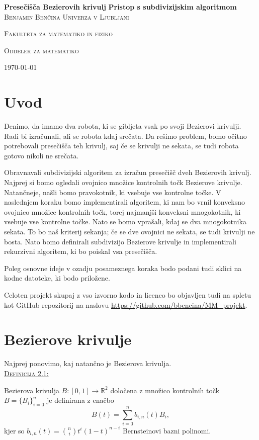 \documentclass[a4paper, 12pt]{article} %
\newenvironment{matematika}[1]{
{\underline{\textsc{#1:}}}
}{
}
\begin{document}
\begin{titlepage}
\centering
\textbf{\Huge{Presečišča Bezierovih krivulj}}
\vfill
\textbf{\LARGE{Pristop s subdivizijskim algoritmom}}
\vfill\vfill
\textsc{\Large{Benjamin Benčina}}
\vfill\vfill
\textsc{\large{Univerza v Ljubljani}}

\textsc{\large{Fakulteta za matematiko in fiziko}}

\textsc{\large{Oddelek za matematiko}}
\vfill\vfill\vfill
	
{\large\today}

\end{titlepage}

\tableofcontents
\newpage

\section{Uvod}

Denimo, da imamo dva robota, ki se gibljeta vsak po svoji Bezierovi krivulji. Radi bi izračunali, ali se robota kdaj srečata. Da rešimo problem, bomo očitno potrebovali presečišča teh krivulj, saj če se krivulji ne sekata, se tudi robota gotovo nikoli ne srečata.

Obravnavali subdivizijski algoritem za izračun presečišč dveh Bezierovih krivulj. Najprej si bomo ogledali ovojnico množice kontrolnih točk Bezierove krivulje. Natančneje, našli bomo pravokotnik, ki vsebuje vse kontrolne točke. V naslednjem koraku bomo implementirali algoritem, ki nam bo vrnil konveksno ovojnico množice kontrolnih točk, torej najmanjši konveksni mnogokotnik, ki vsebuje vse kontrolne točke. Nato se bomo vprašali, kdaj se dva mnogokotnika sekata. To bo naš kriterij sekanja; če se dve ovojnici ne sekata, se tudi krivulji ne bosta. Nato bomo definirali subdivizijo Bezierove krivulje in implementirali rekurzivni algoritem, ki bo poiskal vsa presečišča.

Poleg osnovne ideje v ozadju posameznega koraka bodo podani tudi sklici na kodne datoteke, ki bodo priložene.

Celoten projekt skupaj z vso izvorno kodo in licenco bo objavljen tudi na spletu kot GitHub repozitorij na naslovu \url{https://github.com/bbencina/MM_projekt}.

\section{Bezierove krivulje}

Najprej ponovimo, kaj natančno je Bezierova krivulja.\\
\begin{matematika}{Definicija 2.1}
Bezierova krivulja $B\colon [0, 1] \to \mathbb{R}^2$ določena z množico kontrolnih točk $B = \lbrace B_i \rbrace_{i = 0}^n$ je definirana z enačbo
\[ B(t) = \sum_{i = 0}^n b_{i,n}(t)B_i, \]
kjer so $b_{i,n}(t) = \binom{n}{i}t^{i}(1-t)^{n-i}$ Bernsteinovi bazni polinomi.
\end{matematika}
\end{document}

